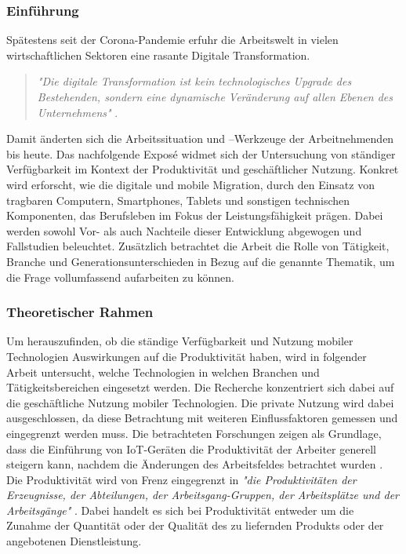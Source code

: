 \documentclass[12pt,a4paper]{article}
\title{\titlename}
\author{Reichard, Pia~~~Berger, Vivian~~~Engelhardt, Philipp~~~Müller, Maximilian}
\date{\exposedate}
\begin{document}

\maketitle 
\thispagestyle{empty} %
\newpage	

\subsubsection*{Einführung}
Spätestens seit der Corona-Pandemie erfuhr die Arbeitswelt in vielen wirtschaftlichen Sektoren eine rasante Digitale Transformation.

\begin{quote}
\emph{"Die digitale Transformation ist kein technologisches Upgrade des Bestehenden, sondern eine dynamische Veränderung auf allen Ebenen des Unternehmens"} \parencite{frauenhofer}.
\end{quote}

Damit änderten sich die Arbeitssituation und –Werkzeuge der Arbeitnehmenden bis heute. Das nachfolgende Exposé widmet sich der Untersuchung von ständiger Verfügbarkeit im Kontext der Produktivität und geschäftlicher Nutzung. Konkret wird erforscht, wie die digitale und mobile Migration, durch den Einsatz von tragbaren Computern, Smartphones, Tablets und sonstigen technischen Komponenten, das Berufsleben im Fokus der Leistungsfähigkeit prägen. Dabei werden sowohl Vor- als auch Nachteile dieser Entwicklung abgewogen und Fallstudien beleuchtet. Zusätzlich betrachtet die Arbeit die Rolle von Tätigkeit, Branche und Generationsunterschieden in Bezug auf die genannte Thematik, um die Frage vollumfassend aufarbeiten zu können.

\subsubsection*{Theoretischer Rahmen}
Um herauszufinden, ob die ständige Verfügbarkeit und Nutzung mobiler Technologien Auswirkungen auf die Produktivität haben, wird in folgender Arbeit untersucht, welche Technologien in welchen Branchen und Tätigkeitsbereichen eingesetzt werden. 
Die Recherche konzentriert sich dabei auf die geschäftliche Nutzung mobiler Technologien.  
Die private Nutzung wird dabei ausgeschlossen, da diese Betrachtung mit weiteren Einflussfaktoren gemessen und eingegrenzt werden muss.
Die betrachteten Forschungen zeigen als Grundlage, dass die Einführung von IoT-Geräten die Produktivität der Arbeiter generell steigern kann, nachdem die Änderungen des Arbeitsfeldes betrachtet wurden \parencite[vgl.][]{nappi2020internet}.
Die Produktivität wird von Frenz eingegrenzt in \emph{"die Produktivitäten der Erzeugnisse, der Abteilungen, der Arbeitsgang-Gruppen, der Arbeitsplätze und der Arbeitsgänge"} \parencite{frenz1963definition}.
Dabei handelt es sich bei Produktivität entweder um die Zunahme der Quantität oder der Qualität des zu liefernden Produkts oder der angebotenen Dienstleistung. 
\end{document}
